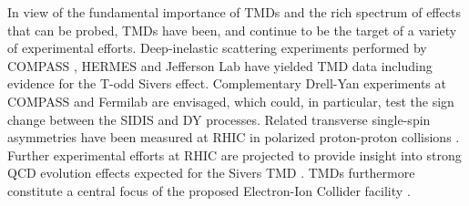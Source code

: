 In view of the fundamental importance of TMDs and the rich spectrum of
effects that can be probed, TMDs have been, and continue to be the
target of a variety of experimental efforts. Deep-inelastic scattering
experiments performed by COMPASS \cite{Alekseev:2008aa,Adolph:2014fjw},
HERMES \cite{Airapetian:2009ae,Airapetian:2013bim} and Jefferson Lab
\cite{Qian:2011py,Avakian:2010ae} have yielded TMD data including evidence
for the T-odd Sivers effect. Complementary Drell-Yan experiments at
COMPASS \cite{Gautheron:2010wva} and Fermilab \cite{Brown:2014sea} are
envisaged, which could, in particular, test the sign change between
the SIDIS and DY processes. Related transverse single-spin
asymmetries have been measured at RHIC in polarized proton-proton
collisions \cite{Adare:2013ekj,Adamczyk:2012xd}. Further experimental
efforts at RHIC are projected to provide insight into strong QCD evolution
effects expected for the Sivers TMD \cite{Echevarria:2014vda}.
TMDs furthermore constitute a central focus of the proposed Electron-Ion
Collider facility \cite{Accardi:2012qut}.

